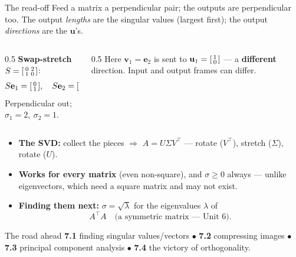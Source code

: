 \documentclass[aspectratio=169, 11pt]{beamer}
\newcommand{\uu}{\mathbf{u}}
\newcommand{\vv}{\mathbf{v}}
\newcommand{\ee}{\mathbf{e}}
\newcommand{\T}{^{\top}}
\begin{document}
\begin{frame}[t, plain]
  \begin{block}{The read-off}
    Feed a matrix a perpendicular pair; the outputs are perpendicular too. The output \emph{lengths} are
    the singular values (largest first); the output \emph{directions} are the $\uu$'s.
  \end{block}
  \begin{columns}[T]
    \begin{column}{0.5\textwidth}
      \textbf{Swap-stretch} $S=\begin{bsmallmatrix} 0 & 2\\ 1 & 0 \end{bsmallmatrix}$:
      \[ S\ee_1=\begin{bsmallmatrix} 0\\1 \end{bsmallmatrix},\quad S\ee_2=\begin{bsmallmatrix} 2\\0 \end{bsmallmatrix}. \]
      Perpendicular out; $\sigma_1=2,\ \sigma_2=1$.
    \end{column}
    \begin{column}{0.5\textwidth}
      Here $\vv_1=\ee_2$ is sent to $\uu_1=\begin{bsmallmatrix} 1\\0 \end{bsmallmatrix}$ --- a
      \textbf{different} direction. Input and output frames can differ.
    \end{column}
  \end{columns}
\end{frame}

\begin{frame}[t, plain]
  \begin{itemize}
    \setlength{\itemsep}{6pt}
    \item \textbf{The SVD:} collect the pieces $\Rightarrow$ $A=U\Sigma V\T$ --- rotate ($V\T$), stretch
          ($\Sigma$), rotate ($U$).
    \item \textbf{Works for every matrix} (even non-square), and $\sigma\ge0$ always --- unlike
          eigenvectors, which need a square matrix and may not exist.
    \item \textbf{Finding them next:} $\sigma=\sqrt{\lambda}$ for the eigenvalues $\lambda$ of
          \[ A\T A \quad\text{(a symmetric matrix --- Unit 6).} \]
  \end{itemize}
  \vspace{2pt}
  \begin{block}{The road ahead}
    \textbf{7.1} finding singular values/vectors \;$\bullet$\; \textbf{7.2} compressing images \;$\bullet$\;
    \textbf{7.3} principal component analysis \;$\bullet$\; \textbf{7.4} the victory of orthogonality.
  \end{block}
\end{frame}
\end{document}
